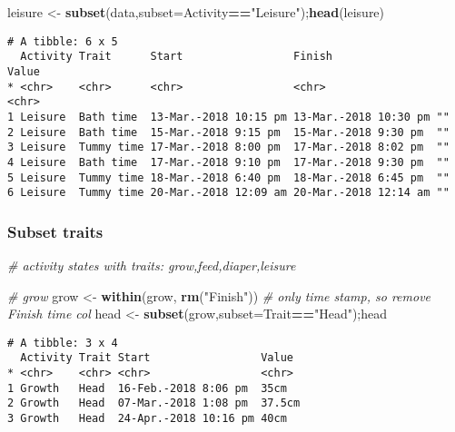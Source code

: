 \documentclass[10,portrait]{article}
\newenvironment{Shaded}{\begin{snugshade}}{\end{snugshade}}
\newcommand{\KeywordTok}[1]{\textcolor[rgb]{0.13,0.29,0.53}{\textbf{#1}}}
\newcommand{\DataTypeTok}[1]{\textcolor[rgb]{0.13,0.29,0.53}{#1}}
\newcommand{\StringTok}[1]{\textcolor[rgb]{0.31,0.60,0.02}{#1}}
\newcommand{\CommentTok}[1]{\textcolor[rgb]{0.56,0.35,0.01}{\textit{#1}}}
\newcommand{\OperatorTok}[1]{\textcolor[rgb]{0.81,0.36,0.00}{\textbf{#1}}}
\newcommand{\NormalTok}[1]{#1}
\begin{document}
\begin{Shaded}
\begin{Highlighting}[]
\NormalTok{leisure <-}\StringTok{ }\KeywordTok{subset}\NormalTok{(data,}\DataTypeTok{subset=}\NormalTok{Activity}\OperatorTok{==}\StringTok{"Leisure"}\NormalTok{);}\KeywordTok{head}\NormalTok{(leisure)}
\end{Highlighting}
\end{Shaded}

\begin{verbatim}
# A tibble: 6 x 5
  Activity Trait      Start                 Finish                Value
* <chr>    <chr>      <chr>                 <chr>                 <chr>
1 Leisure  Bath time  13-Mar.-2018 10:15 pm 13-Mar.-2018 10:30 pm ""   
2 Leisure  Bath time  15-Mar.-2018 9:15 pm  15-Mar.-2018 9:30 pm  ""   
3 Leisure  Tummy time 17-Mar.-2018 8:00 pm  17-Mar.-2018 8:02 pm  ""   
4 Leisure  Bath time  17-Mar.-2018 9:10 pm  17-Mar.-2018 9:30 pm  ""   
5 Leisure  Tummy time 18-Mar.-2018 6:40 pm  18-Mar.-2018 6:45 pm  ""   
6 Leisure  Tummy time 20-Mar.-2018 12:09 am 20-Mar.-2018 12:14 am ""   
\end{verbatim}

\subsubsection{Subset traits}\label{subset-traits}

\begin{Shaded}
\begin{Highlighting}[]
\CommentTok{# activity states with traits: grow,feed,diaper,leisure}

\CommentTok{# grow}
\NormalTok{grow <-}\StringTok{ }\KeywordTok{within}\NormalTok{(grow, }\KeywordTok{rm}\NormalTok{(}\StringTok{"Finish"}\NormalTok{)) }\CommentTok{# only time stamp, so remove Finish time col}
\NormalTok{head <-}\StringTok{ }\KeywordTok{subset}\NormalTok{(grow,}\DataTypeTok{subset=}\NormalTok{Trait}\OperatorTok{==}\StringTok{"Head"}\NormalTok{);head}
\end{Highlighting}
\end{Shaded}

\begin{verbatim}
# A tibble: 3 x 4
  Activity Trait Start                 Value 
* <chr>    <chr> <chr>                 <chr> 
1 Growth   Head  16-Feb.-2018 8:06 pm  35cm  
2 Growth   Head  07-Mar.-2018 1:08 pm  37.5cm
3 Growth   Head  24-Apr.-2018 10:16 pm 40cm  
\end{verbatim}
\end{document}
